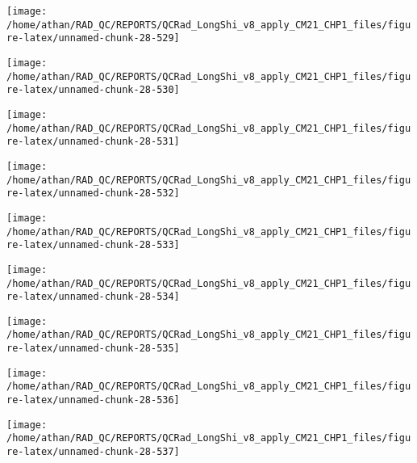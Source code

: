 \documentclass[
  10pt,
  a4paper,oneside]{article}
\begin{document}
\begin{center}\texttt{[image: /home/athan/RAD\_QC/REPORTS/QCRad\_LongShi\_v8\_apply\_CM21\_CHP1\_files/figure-latex/unnamed-chunk-28-529]} \end{center}

\begin{center}\texttt{[image: /home/athan/RAD\_QC/REPORTS/QCRad\_LongShi\_v8\_apply\_CM21\_CHP1\_files/figure-latex/unnamed-chunk-28-530]} \end{center}

\begin{center}\texttt{[image: /home/athan/RAD\_QC/REPORTS/QCRad\_LongShi\_v8\_apply\_CM21\_CHP1\_files/figure-latex/unnamed-chunk-28-531]} \end{center}

\begin{center}\texttt{[image: /home/athan/RAD\_QC/REPORTS/QCRad\_LongShi\_v8\_apply\_CM21\_CHP1\_files/figure-latex/unnamed-chunk-28-532]} \end{center}

\begin{center}\texttt{[image: /home/athan/RAD\_QC/REPORTS/QCRad\_LongShi\_v8\_apply\_CM21\_CHP1\_files/figure-latex/unnamed-chunk-28-533]} \end{center}

\begin{center}\texttt{[image: /home/athan/RAD\_QC/REPORTS/QCRad\_LongShi\_v8\_apply\_CM21\_CHP1\_files/figure-latex/unnamed-chunk-28-534]} \end{center}

\begin{center}\texttt{[image: /home/athan/RAD\_QC/REPORTS/QCRad\_LongShi\_v8\_apply\_CM21\_CHP1\_files/figure-latex/unnamed-chunk-28-535]} \end{center}

\begin{center}\texttt{[image: /home/athan/RAD\_QC/REPORTS/QCRad\_LongShi\_v8\_apply\_CM21\_CHP1\_files/figure-latex/unnamed-chunk-28-536]} \end{center}

\begin{center}\texttt{[image: /home/athan/RAD\_QC/REPORTS/QCRad\_LongShi\_v8\_apply\_CM21\_CHP1\_files/figure-latex/unnamed-chunk-28-537]} \end{center}
\end{document}
